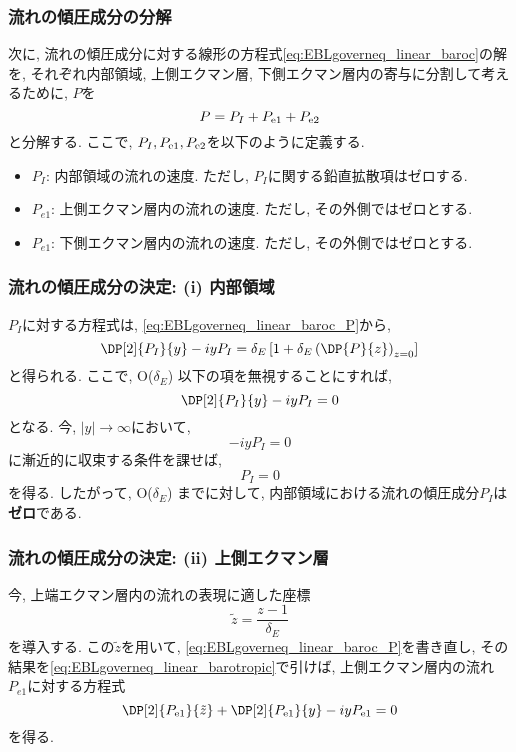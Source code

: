 \subsubsection*{流れの傾圧成分の分解}
次に, 流れの傾圧成分に対する線形の方程式\eqref{eq:EBLgoverneq_linear_baroc}の解を, 
それぞれ内部領域, 上側エクマン層, 下側エクマン層内の寄与に分割して考えるために, $P$を 
\begin{equation}
  P = P_I + P_{\rm e1} + P_{\rm e2}
\end{equation}
と分解する. 
ここで, $P_I, P_{\rm e1}, P_{\rm e2}$を以下のように定義する. 
\begin{itemize}
 \item $P_I$: 内部領域の流れの速度. ただし, $P_I$に関する鉛直拡散項はゼロする.  
 \item $P_{e1}$: 上側エクマン層内の流れの速度. ただし, その外側ではゼロとする. 
 \item $P_{e1}$: 下側エクマン層内の流れの速度. ただし, その外側ではゼロとする. 
\end{itemize}

\subsubsection*{流れの傾圧成分の決定: (i) 内部領域}
$P_I$に対する方程式は, \eqref{eq:EBLgoverneq_linear_baroc_P}から, 
\begin{equation}
 \DP[2]{P_I}{y} - iyP_I = \delta_E \left[ 1 + \delta_E \left(\DP{P}{z}\right)_{z=0} \right]
\end{equation}
と得られる. 
ここで, O($\delta_E$) 以下の項を無視することにすれば, 
\begin{equation}
 \DP[2]{P_I}{y} - iyP_I = 0
\end{equation}
となる. 
今, $|y| \to \infty$において, 
\begin{equation}
  - iy P_I = 0
\end{equation}
に漸近的に収束する条件を課せば,
\begin{equation}
  P_I = 0
\end{equation}
を得る. 
したがって, O($\delta_E$) までに対して, 
内部領域における流れの傾圧成分$P_I$は\textbf{ゼロ}である. 

\subsubsection*{流れの傾圧成分の決定: (ii) 上側エクマン層}
今, 上端エクマン層内の流れの表現に適した座標
\begin{equation}
  \tilde{z} = \dfrac{z-1}{\delta_E}
\end{equation}
を導入する. 
この$\tilde{z}$を用いて, \eqref{eq:EBLgoverneq_linear_baroc_P}を書き直し, 
その結果を\eqref{eq:EBLgoverneq_linear_barotropic}で引けば, 
上側エクマン層内の流れ$P_{e1}$に対する方程式
\begin{equation}
  \DP[2]{P_{\rm e1}}{\tilde{z}} + \DP[2]{P_{\rm e1}}{y} - iy P_{\rm e1} = 0
\label{eq:EBLgoverneq_linear_Pe1}
\end{equation}
を得る. 

